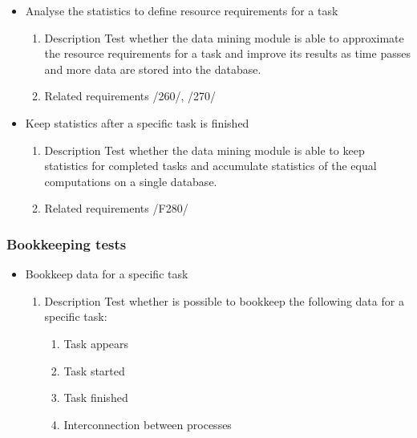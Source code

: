 {\begin{itemize}
				
				
				\item Analyse the statistics to define resource requirements for a task
				\begin{enumerate}
					\item Description\newline
Test whether the data mining module is able to approximate the resource requirements for a task and improve its results as time passes and more data are stored into the database.
					\item Related requirements\newline
					/260/, /270/
				\end{enumerate}
				
				
				
				\item Keep statistics after a specific task is finished
				\begin{enumerate}
					\item Description\newline
Test whether the data mining module is able to keep statistics for completed tasks and accumulate statistics of the equal computations on a single database.
					\item Related requirements\newline
					/F280/
				\end{enumerate}
				
			
		\end{itemize}	
		\subsubsection{Bookkeeping tests}
		\begin{itemize}
		
		\item Bookkeep data for a specific task
				\begin{enumerate}
					\item Description\newline
Test whether is possible to bookkeep the following data for a specific task: 	
					\begin{enumerate}
					\item Task appears
					\item Task started
					\item Task finished 
					\item Interconnection between processes
					\end{enumerate}
					

\end{enumerate}
\end{itemize}}
